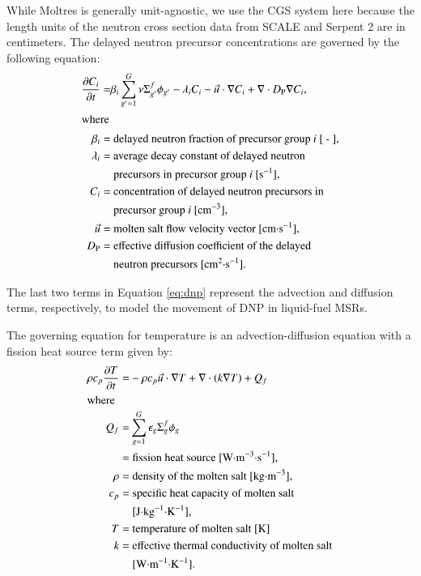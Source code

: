 While Moltres is generally unit-agnostic, we use the CGS system here because
the length units of the neutron cross section data from SCALE and Serpent 2
are in centimeters. The delayed neutron precursor concentrations are
governed by the following equation:
%
\begin{align}
    \frac{\partial C_i}{\partial t} =& \beta_i \sum^G_{g'=1} \nu \Sigma^f_{g'}
    \phi_{g'} - \lambda_i C_i - \vec{u} \cdot \nabla C_i + \nabla \cdot
    D_{\text{P}} \nabla C_i, \label{eq:dnp} \\
    \intertext{where}
    \beta_i =& \text{ delayed neutron fraction of precursor group $i$ [ - ],}
    \nonumber \\
    \lambda_i =& \text{ average decay constant of delayed neutron} \nonumber \\
    &\text{ precursors in precursor group $i$ [s$^{-1}$],} \nonumber \\
    C_i =& \text{ concentration of delayed neutron precursors in}
    \nonumber \\
    &\text{ precursor group $i$ [cm$^{-3}$],} \nonumber \\
    \vec{u} =& \text{ molten salt flow velocity vector [cm$\cdot$s$^{-1}$],}
    \nonumber \\
    D_{\text{P}} =& \text{ effective diffusion coefficient of the delayed}
    \nonumber \\
    &\text{ neutron precursors [cm$^2\cdot$s$^{-1}$].} \nonumber
\end{align}

The last two terms in Equation \ref{eq:dnp} represent the advection and
diffusion terms, respectively, to model the movement of \gls{DNP} in
liquid-fuel \glspl{MSR}.

The governing equation for temperature is an advection-diffusion equation with
a fission heat source term given by:
%
\begin{align}
    \rho c_{p} \frac{\partial T}{\partial t} =& - \rho c_p \vec{u}
    \cdot \nabla T + \nabla \cdot \left(k \nabla T \right) + Q_f
    \label{eq:temp} \\
    \intertext{where}
    Q_f =& \sum^G_{g=1} \epsilon_g \Sigma_g^f \phi_g \nonumber \\
    =& \text{ fission heat source [W$\cdot$m$^{-3}\cdot$s$^{-1}$],} \nonumber
    \\
    \rho =& \text{ density of the molten salt [kg$\cdot$m$^{-3}$],}
    \nonumber \\
    c_p =& \text{ specific heat capacity of molten salt} \nonumber \\
    &\text{ [J$\cdot$kg$^{-1}\cdot$K$^{-1}$],} \nonumber \\
    T =& \text{ temperature of molten salt [K]} \nonumber \\
    k =& \text{ effective thermal conductivity of molten salt} \nonumber \\
    &\text{ [W$\cdot$m$^{-1}\cdot$K$^{-1}$].} \nonumber
\end{align}

